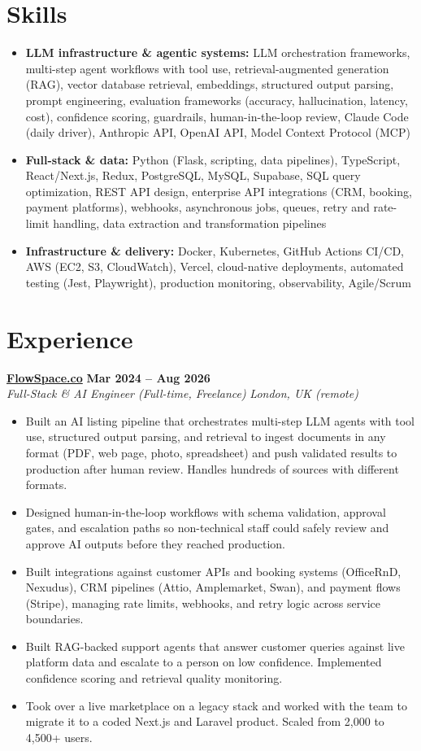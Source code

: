 \documentclass[a4paper,10pt]{article}
\newcommand{\role}[4]{%
 \textbf{#1} \hfill \textbf{#2}\\[1pt]%
 \textit{#3} \hfill \textit{#4}\\[2pt]%
}
\begin{document}
\section{Skills}
\begin{itemize}
 \item \textbf{LLM infrastructure \& agentic systems:} LLM orchestration frameworks, multi-step agent workflows with tool use, retrieval-augmented generation (RAG), vector database retrieval, embeddings, structured output parsing, prompt engineering, evaluation frameworks (accuracy, hallucination, latency, cost), confidence scoring, guardrails, human-in-the-loop review, Claude Code (daily driver), Anthropic API, OpenAI API, Model Context Protocol (MCP)
 \item \textbf{Full-stack \& data:} Python (Flask, scripting, data pipelines), TypeScript, React/Next.js, Redux, PostgreSQL, MySQL, Supabase, SQL query optimization, REST API design, enterprise API integrations (CRM, booking, payment platforms), webhooks, asynchronous jobs, queues, retry and rate-limit handling, data extraction and transformation pipelines
 \item \textbf{Infrastructure \& delivery:} Docker, Kubernetes, GitHub Actions CI/CD, AWS (EC2, S3, CloudWatch), Vercel, cloud-native deployments, automated testing (Jest, Playwright), production monitoring, observability, Agile/Scrum
\end{itemize}

\section{Experience}

\role{\href{https://flowspace.co}{FlowSpace.co}}{Mar 2024 -- Aug 2026}{Full-Stack \& AI Engineer (Full-time, Freelance)}{London, UK (remote)}
\begin{itemize}
 \item Built an AI listing pipeline that orchestrates multi-step LLM agents with tool use, structured output parsing, and retrieval to ingest documents in any format (PDF, web page, photo, spreadsheet) and push validated results to production after human review. Handles hundreds of sources with different formats.
 \item Designed human-in-the-loop workflows with schema validation, approval gates, and escalation paths so non-technical staff could safely review and approve AI outputs before they reached production.
 \item Built integrations against customer APIs and booking systems (OfficeRnD, Nexudus), CRM pipelines (Attio, Amplemarket, Swan), and payment flows (Stripe), managing rate limits, webhooks, and retry logic across service boundaries.
 \item Built RAG-backed support agents that answer customer queries against live platform data and escalate to a person on low confidence. Implemented confidence scoring and retrieval quality monitoring.
 \item Took over a live marketplace on a legacy stack and worked with the team to migrate it to a coded Next.js and Laravel product. Scaled from 2,000 to 4,500+ users.
\end{itemize}
\end{document}
